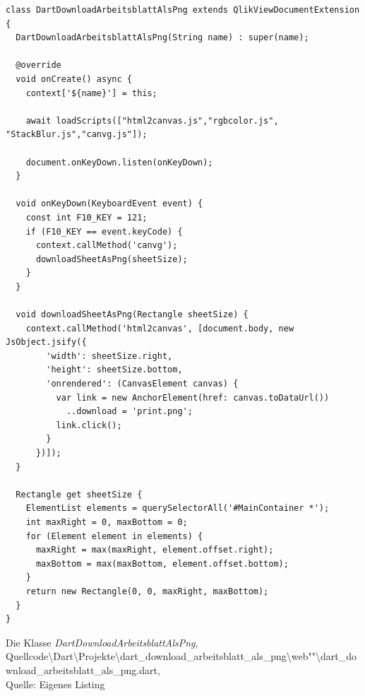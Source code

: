 \begin{listing}[htbp]
\begin{verbatim}
class DartDownloadArbeitsblattAlsPng extends QlikViewDocumentExtension {
  DartDownloadArbeitsblattAlsPng(String name) : super(name);

  @override
  void onCreate() async {
    context['${name}'] = this;     
    
    await loadScripts(["html2canvas.js","rgbcolor.js", "StackBlur.js","canvg.js"]);
    
    document.onKeyDown.listen(onKeyDown);
  }

  void onKeyDown(KeyboardEvent event) {
    const int F10_KEY = 121;
    if (F10_KEY == event.keyCode) {
      context.callMethod('canvg');
      downloadSheetAsPng(sheetSize);
    }
  }

  void downloadSheetAsPng(Rectangle sheetSize) {
    context.callMethod('html2canvas', [document.body, new JsObject.jsify({
        'width': sheetSize.right,
        'height': sheetSize.bottom,
        'onrendered': (CanvasElement canvas) {
          var link = new AnchorElement(href: canvas.toDataUrl())
            ..download = 'print.png';
          link.click();
        }
      })]);
  }

  Rectangle get sheetSize {
    ElementList elements = querySelectorAll('#MainContainer *');
    int maxRight = 0, maxBottom = 0;
    for (Element element in elements) {
      maxRight = max(maxRight, element.offset.right);
      maxBottom = max(maxBottom, element.offset.bottom);
    }
    return new Rectangle(0, 0, maxRight, maxBottom);
  }
}
\end{verbatim}
\caption[Die Klasse \textit{DartDownloadArbeitsblattAlsPng}]{Die Klasse \textit{DartDownloadArbeitsblattAlsPng}, \\Quellcode\textbackslash{}Dart\textbackslash{}Projekte\textbackslash{}dart\_download\_arbeitsblatt\_als\_png\textbackslash{}web""\textbackslash{}dart\_download\_arbeitsblatt\_als\_png.dart, \\Quelle: Eigenes Listing}
\label{lst:DownloadArbeitsblattAlsPngDartDownloadArbeitsblattAlsPngDart}
\end{listing}

